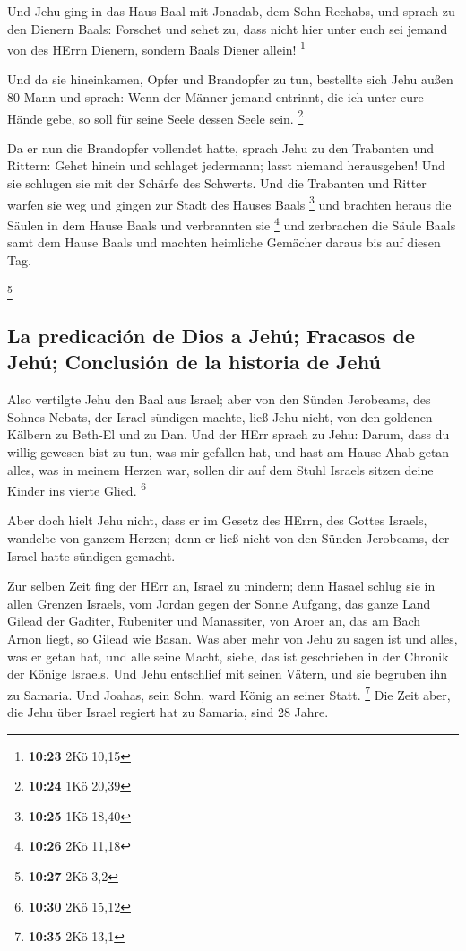  Und Jehu ging in das Haus Baal mit Jonadab, dem Sohn
Rechabs, und sprach zu den Dienern Baals: Forschet und sehet zu, dass
nicht hier unter euch sei jemand von des HErrn Dienern, sondern Baals
Diener allein! \footnote{\textbf{10:23} 2Kö 10,15}

 Und da sie hineinkamen, Opfer und Brandopfer zu tun,
bestellte sich Jehu außen 80 Mann und sprach: Wenn der Männer jemand
entrinnt, die ich unter eure Hände gebe, so soll für seine Seele dessen
Seele sein. \footnote{\textbf{10:24} 1Kö 20,39}

 Da er nun die Brandopfer vollendet hatte, sprach Jehu zu
den Trabanten und Rittern: Gehet hinein und schlaget jedermann; lasst
niemand herausgehen! Und sie schlugen sie mit der Schärfe des Schwerts.
Und die Trabanten und Ritter warfen sie weg und gingen zur Stadt des
Hauses Baals \footnote{\textbf{10:25} 1Kö 18,40}  und
brachten heraus die Säulen in dem Hause Baals und verbrannten sie
\footnote{\textbf{10:26} 2Kö 11,18}  und zerbrachen die
Säule Baals samt dem Hause Baals und machten heimliche Gemächer daraus
bis auf diesen Tag.

\footnote{\textbf{10:27} 2Kö 3,2}

\hypertarget{la-predicaciuxf3n-de-dios-a-jehuxfa-fracasos-de-jehuxfa-conclusiuxf3n-de-la-historia-de-jehuxfa}{%
\subsection{La predicación de Dios a Jehú; Fracasos de Jehú; Conclusión
de la historia de
Jehú}\label{la-predicaciuxf3n-de-dios-a-jehuxfa-fracasos-de-jehuxfa-conclusiuxf3n-de-la-historia-de-jehuxfa}}

 Also vertilgte Jehu den Baal aus Israel; 
aber von den Sünden Jerobeams, des Sohnes Nebats, der Israel sündigen
machte, ließ Jehu nicht, von den goldenen Kälbern zu Beth-El und zu Dan.
 Und der HErr sprach zu Jehu: Darum, dass du willig
gewesen bist zu tun, was mir gefallen hat, und hast am Hause Ahab getan
alles, was in meinem Herzen war, sollen dir auf dem Stuhl Israels sitzen
deine Kinder ins vierte Glied. \footnote{\textbf{10:30} 2Kö 15,12}

 Aber doch hielt Jehu nicht, dass er im Gesetz des HErrn,
des Gottes Israels, wandelte von ganzem Herzen; denn er ließ nicht von
den Sünden Jerobeams, der Israel hatte sündigen gemacht.

 Zur selben Zeit fing der HErr an, Israel zu mindern;
denn Hasael schlug sie in allen Grenzen Israels,  vom
Jordan gegen der Sonne Aufgang, das ganze Land Gilead der Gaditer,
Rubeniter und Manassiter, von Aroer an, das am Bach Arnon liegt, so
Gilead wie Basan.  Was aber mehr von Jehu zu sagen ist
und alles, was er getan hat, und alle seine Macht, siehe, das ist
geschrieben in der Chronik der Könige Israels.  Und Jehu
entschlief mit seinen Vätern, und sie begruben ihn zu Samaria. Und
Joahas, sein Sohn, ward König an seiner Statt. \footnote{\textbf{10:35}
  2Kö 13,1}  Die Zeit aber, die Jehu über Israel regiert
hat zu Samaria, sind 28 Jahre.

